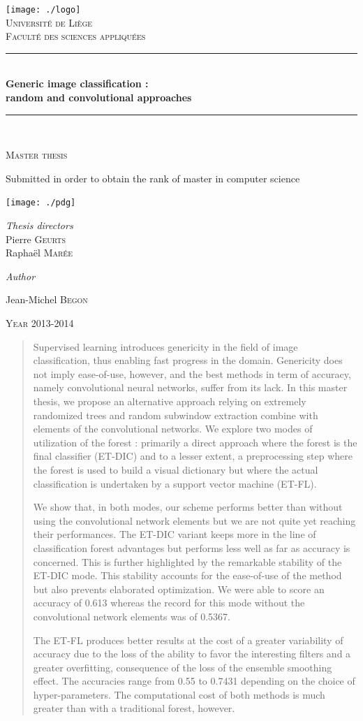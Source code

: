 \documentclass[a4paper]{report}
\newlength{\larg}
\newcommand{\titleg}{
  \begin{titlepage}
  \begin{center}

  \bigskip
  \bigskip
  \bigskip
  \bigskip 
  \bigskip


  \texttt{[image: ./logo]}\\[1cm]
  \smallskip
  \textsc{\LARGE Université de Liège}\\
  \smallskip
  \textsc{Faculté des sciences appliquées}\\

  \bigskip



  \rule{\columnwidth}{1pt} \\[0.4cm] 
  { \huge \bfseries Generic image classification : \\ \bigskip random and convolutional approaches}\\[0.4cm]
  \rule{\columnwidth}{1pt} \\[0.2cm]



  \begin{minipage}{0.7\textwidth} 
  \begin{center} \large 
  \textsc{Master thesis} \\
  \end{center} \end{minipage}
	
	\begin{center}
	Submitted in order to obtain the rank of master in computer science \\
	\end{center}

  \vfill
	\texttt{[image: ./pdg]}\\[1cm]


  \begin{minipage}{0.7\textwidth} \begin{center}
  \textit{Thesis directors} \\
  \large Pierre \textsc{Geurts} \\
  \large Raphaël \textsc{Marée} 
  \end{center} \end{minipage} 

  \bigskip
  \bigskip

  \textit{Author} \\
  \begin{minipage}{0.7\textwidth} \begin{center}
  \large Jean-Michel \textsc{Begon}
  \end{center} \end{minipage} 
  


  \bigskip
  \bigskip
  \bigskip

  \textsc{Year 2013-2014}
  \end{center}
  \end{titlepage}
}
\begin{document}
\pagestyle{fancy}
\lhead{}
\chead{}
\rhead{\itshape \textcolor{gris}{\rightmark}} %
\lfoot{\itshape \textcolor{gris}{Generic image classification - The RandConv framework}}
\cfoot{}
\rfoot{\itshape \textcolor{gris}{\thepage}}
\renewcommand{\headrulewidth}{0.4pt}
\renewcommand{\footrulewidth}{0.4pt}

\thispagestyle{empty}
\titleg

\newpage

\begin{abstract}
Supervised learning introduces genericity in the field of image classification, thus enabling fast progress in the domain. Genericity does not imply ease-of-use, however, and the best methods in term of accuracy, namely convolutional neural networks, suffer from its lack. In this master thesis, we propose an alternative approach relying on extremely randomized trees and random subwindow extraction combine with elements of the convolutional networks. We explore two modes of utilization of the forest : primarily a direct approach where the forest is the final classifier (ET-DIC) and to a lesser extent, a preprocessing step where the forest is used to build a visual dictionary but where the actual classification is undertaken by a support vector machine (ET-FL).
\par
We show that, in both modes, our scheme performs better than without using the convolutional network elements but we are not quite yet reaching their performances. The ET-DIC variant keeps more in the line of classification forest advantages but performs less well as far as accuracy is concerned. This is further highlighted by the remarkable stability of the ET-DIC mode. This stability accounts for the ease-of-use of the method but also prevents elaborated optimization. We were able to score an accuracy of 0.613 whereas the record for this mode without the convolutional network elements was of 0.5367.
\par
The ET-FL produces better results at the cost of a greater variability of accuracy due to the loss of the ability to favor the interesting filters and a greater overfitting, consequence of the loss of the ensemble smoothing effect. The accuracies range from 0.55 to 0.7431 depending on the choice of hyper-parameters. 
The computational cost of both methods is much greater than with a traditional forest, however.


\end{abstract}
\end{document}
